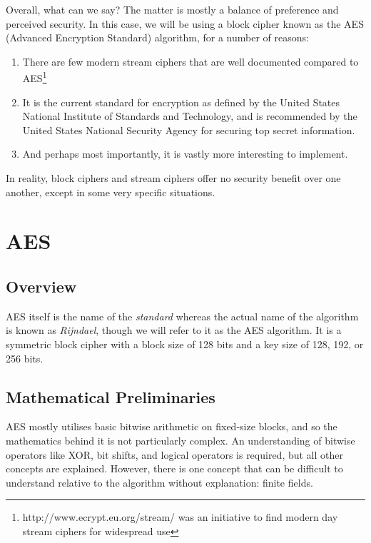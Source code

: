     Overall, what can we say? The matter is mostly a balance of preference and perceived security. In this case, we will be using a block cipher known as the AES (Advanced Encryption Standard) algorithm, for a number of reasons:
    
    \begin{enumerate}
      \item There are few modern stream ciphers that are well documented compared to AES\footnote{http://www.ecrypt.eu.org/stream/ was an initiative to find modern day stream ciphers for widespread use}
      \item It is the current standard for encryption as defined by the United States National Institute of Standards and Technology, and is recommended by the United States National Security Agency for securing top secret information.
      \item And perhaps most importantly, it is vastly more interesting to implement.
    \end{enumerate}
    
    In reality, block ciphers and stream ciphers offer no security benefit over one another, except in some very specific situations.

\section{AES}
  \subsection{Overview}
  
  AES itself is the name of the \emph{standard} whereas the actual name of the algorithm is known as \emph{Rijndael}, though we will refer to it as the AES algorithm. It is a symmetric block cipher with a block size of 128 bits and a key size of 128, 192, or 256 bits. 
  
  \subsection{Mathematical Preliminaries}
  
  AES mostly utilises basic bitwise arithmetic on fixed-size blocks, and so the mathematics behind it is not particularly complex. An understanding of bitwise operators like XOR, bit shifts, and logical operators is required, but all other concepts are explained. However, there is one concept that can be difficult to understand relative to the algorithm without explanation: finite fields.
  
